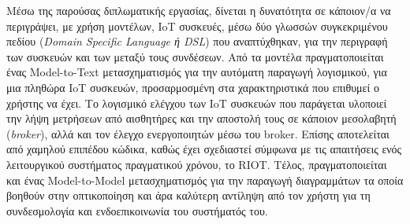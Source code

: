 Μέσω της παρούσας διπλωματικής εργασίας, δίνεται η δυνατότητα σε κάποιον/α να περιγράψει, με χρήση μοντέλων, IoT συσκευές, μέσω δύο γλωσσών συγκεκριμένου πεδίου (\textit{Domain Specific Language ή DSL}) που αναπτύχθηκαν, για την περιγραφή των συσκευών και των μεταξύ τους συνδέσεων. Από τα μοντέλα πραγματοποιείται ένας Model-to-Text μετασχηματισμός για την αυτόματη παραγωγή λογισμικού, για μια πληθώρα IoT συσκευών, προσαρμοσμένη στα χαρακτηριστικά που επιθυμεί ο χρήστης να έχει. Το λογισμικό ελέγχου των IoT συσκευών που παράγεται υλοποιεί την λήψη μετρήσεων από αισθητήρες και την αποστολή τους σε κάποιον μεσολαβητή (\textit{broker}), αλλά και τον έλεγχο ενεργοποιητών μέσω του broker. Επίσης αποτελείται από χαμηλού επιπέδου κώδικα, καθώς έχει σχεδιαστεί σύμφωνα με τις απαιτήσεις ενός λειτουργικού συστήματος πραγματικού χρόνου, το RIOT. Τέλος, πραγματοποιείται και ένας Model-to-Model μετασχηματισμός για την παραγωγή διαγραμμάτων τα οποία βοηθούν στην οπτικοποίηση και άρα καλύτερη αντίληψη από τον χρήστη για τη συνδεσμολογία και ενδοεπικοινωνία του συστήματός του.